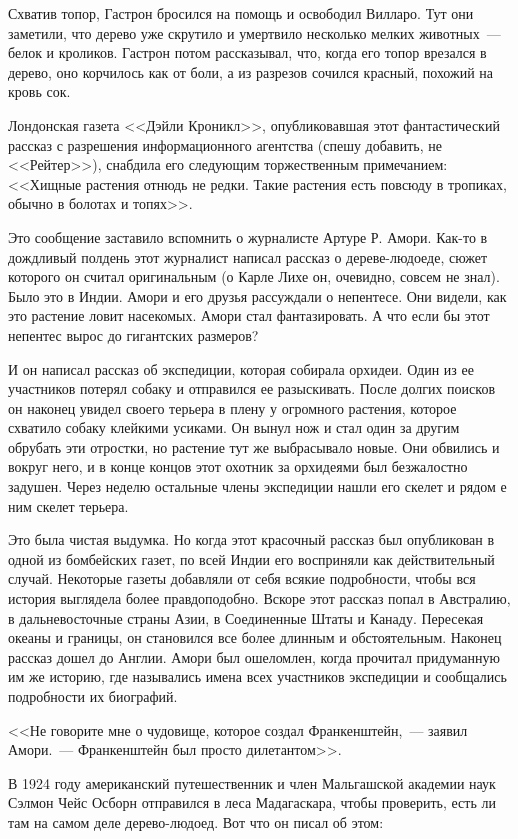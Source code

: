 \documentclass[12pt,a4paper,twoside,openany,svgnames]{memoir}
\begin{document}
Схватив топор, Гастрон бросился на помощь и освободил Вилларо. Тут они заметили, что дерево уже скрутило и умертвило несколько мелких животных~--- белок и кроликов. Гастрон потом рассказывал, что, когда его топор врезался в дерево, оно корчилось как от боли, а из разрезов сочился красный, похожий на кровь сок.

Лондонская газета <<Дэйли Кроникл>>, опубликовавшая этот фантастический рассказ с разрешения информационного агентства (спешу добавить, не <<Рейтер>>), снабдила его следующим торжественным примечанием: <<Хищные растения отнюдь не редки. Такие растения есть повсюду в тропиках, обычно в болотах и топях>>.

Это сообщение заставило вспомнить о журналисте Артуре Р. Амори. Как-то в дождливый полдень этот журналист написал рассказ о дереве-людоеде, сюжет которого он считал оригинальным (о Карле Лихе он, очевидно, совсем не знал). Было это в Индии. Амори и его друзья рассуждали о непентесе. Они видели, как это растение ловит насекомых. Амори стал фантазировать. А что если бы этот непентес вырос до гигантских размеров?

И он написал рассказ об экспедиции, которая собирала орхидеи. Один из ее участников потерял собаку и отправился ее разыскивать. После долгих поисков он наконец увидел своего терьера в плену у огромного растения, которое схватило собаку клейкими усиками. Он вынул нож и стал один за другим обрубать эти отростки, но растение тут же выбрасывало новые. Они обвились и вокруг него, и в конце концов этот охотник за орхидеями был безжалостно задушен. Через неделю остальные члены экспедиции нашли его скелет и рядом е ним скелет терьера.

Это была чистая выдумка. Но когда этот красочный рассказ был опубликован в одной из бомбейских газет, по всей Индии его восприняли как действительный случай. Некоторые газеты добавляли от себя всякие подробности, чтобы вся история выглядела более правдоподобно. Вскоре этот рассказ попал в Австралию, в дальневосточные страны Азии, в Соединенные Штаты и Канаду. Пересекая океаны и границы, он становился все более длинным и обстоятельным. Наконец рассказ дошел до Англии. Амори был ошеломлен, когда прочитал придуманную им же историю, где назывались имена всех участников экспедиции и сообщались подробности их биографий.

<<Не говорите мне о чудовище, которое создал Франкенштейн,~--- заявил Амори.~--- Франкенштейн был просто дилетантом>>.

В 1924 году американский путешественник и член Мальгашской академии наук Сэлмон Чейс Осборн отправился в леса Мадагаскара, чтобы проверить, есть ли там на самом деле дерево-людоед. Вот что он писал об этом:
\end{document}
